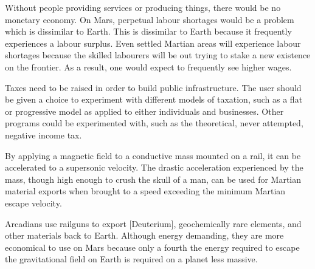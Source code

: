 Without people providing services or producing things, there would be no monetary economy. On Mars, perpetual labour shortages would be a problem which is dissimilar to Earth. This is dissimilar to Earth because it frequently experiences a labour surplus. Even settled Martian areas will experience labour shortages because the skilled labourers will be out trying to stake a new existence on the frontier. As a result, one would expect to frequently see higher wages.

Taxes need to be raised in order to build public infrastructure. The user should be given a choice to experiment with different models of taxation, such as a flat or progressive model as applied to either individuals and businesses. Other programs could be experimented with, such as the theoretical, never attempted, negative income tax.

By applying a magnetic field to a conductive mass mounted on a rail, it can be accelerated to a supersonic velocity. The drastic acceleration experienced by the mass, though high enough to crush the skull of a man, can be used for Martian material exports when brought to a speed exceeding the minimum Martian escape velocity.

Arcadians use railguns to export [Deuterium], geochemically rare elements, and other materials back to Earth. Although energy demanding, they are more economical to use on Mars because only a fourth the energy required to escape the gravitational field on Earth is required on a planet less massive.


